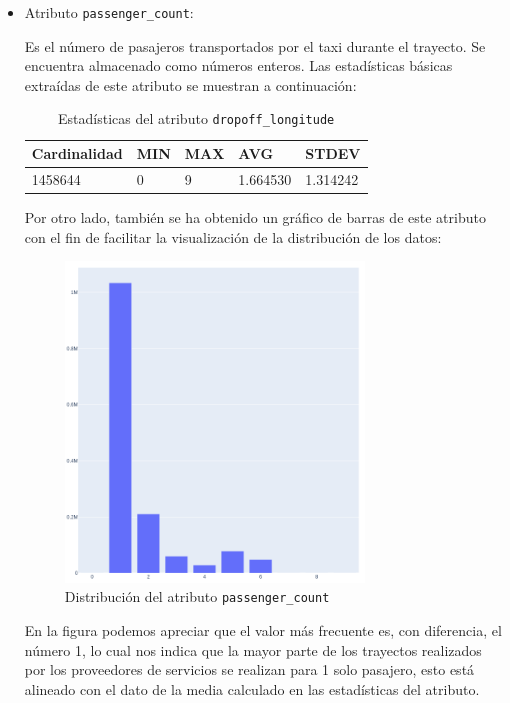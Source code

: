 \documentclass[12pt]{article}
\begin{document}
\begin{itemize}
    \item Atributo \texttt{passenger\_count}:
    
Es el número de pasajeros transportados por el taxi durante el trayecto. Se encuentra almacenado como números enteros. Las estadísticas básicas extraídas de este atributo se muestran a continuación:

\begin{table}[H]
\begin{tabular}{|p{2.5cm}|p{2.5cm}|p{2.5cm}|p{2.5cm}|p{2.5cm}|}
\hline
Cardinalidad & MIN         & MAX        & AVG        & STDEV    \\ \hline
1458644      & 0 & 9 & 1.664530 & 1.314242 \\ \hline
\end{tabular}
\caption{Estadísticas del atributo \texttt{dropoff\_longitude}}
\end{table}

Por otro lado, también se ha obtenido un gráfico de barras de este atributo con el fin de facilitar la visualización de la distribución de los datos:

\begin{figure}[H]
    \centering
    \includegraphics[width=0.75\textwidth]{passenger_count.PNG}
    \caption{Distribución del atributo \texttt{passenger\_count}}
    \label{fig:passenger_count}
\end{figure}

En la figura podemos apreciar que el valor más frecuente es, con diferencia, el número 1, lo cual nos indica que la mayor parte de los trayectos realizados por los proveedores de servicios se realizan para 1 solo pasajero, esto está alineado con el dato de la media calculado en las estadísticas del atributo.


\end{itemize}
\end{document}
